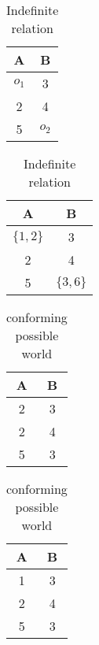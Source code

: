 {\line
\begin{table}[ht]
\begin{minipage}[b]{7cm}
\begin{center}
\begin{tabular}{|c|c|} \hline
A & B  \\ \hline
$o_1$ & 3  \\
2 & 4  \\
5 & $o_2$  \\ \hline
\end{tabular}
\end{center}
\caption{\label{tbl:orobj} OR-object indefinite relation} 
\end{minipage}
\hfill
\begin{minipage}[b]{7cm}
\begin{center}
\begin{tabular}{|c|c|} \hline
A & B  \\ \hline
$\{1,2\}$ & 3  \\
2 & 4  \\
5 & $\{3,6\}$  \\ \hline
\end{tabular}
\end{center}
\caption{\label{tbl:indef1} Indefinite relation} 
\end{minipage}
\end{table}
\begin{table}[ht]
\begin{minipage}[b]{7cm}
\begin{center}
\begin{tabular}{|c|c|} \hline
A & B  \\ \hline
2 & 3  \\
2 & 4  \\
5 & 3  \\ \hline
\end{tabular}
\end{center}
\caption{\label{tbl:noncon1} Non-conforming possible world} 
\end{minipage}
\hfill
\begin{minipage}[b]{7cm}
\begin{center}
\begin{tabular}{|c|c|} \hline
A & B  \\ \hline
1 & 3  \\
2 & 4  \\
5 & 3  \\ \hline
\end{tabular}
\end{center}
\caption{\label{tbl:conform1} conforming possible world} 
\end{minipage}
\end{table}
}



